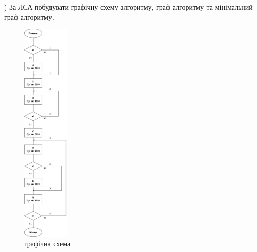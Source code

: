 ) За ЛСА побудувати графічну схему алгоритму, граф алгоритму та
мінімальний граф алгоритму.
\begin{figure}[h]
    \vspace{20mm} 
    \centering
    \includegraphics[width=0.2\textwidth]{reports/algos/lab1/assets/3.jpg}
    \caption{графічна схема}
\end{figure}

